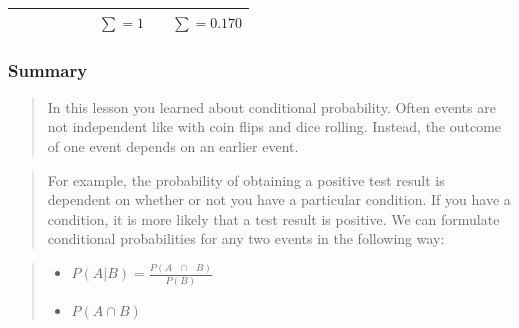\documentclass[]{book}
\providecommand{\tightlist}{%
  \setlength{\itemsep}{0pt}\setlength{\parskip}{0pt}}
\begin{document}
\begin{longtable}[]{@{}ccccccccc@{}}
\begin{minipage}[t]{0.04\columnwidth}\centering\strut
\strut
\end{minipage} & \begin{minipage}[t]{0.04\columnwidth}\centering\strut
\strut
\end{minipage} & \begin{minipage}[t]{0.04\columnwidth}\centering\strut
\strut
\end{minipage} & \begin{minipage}[t]{0.04\columnwidth}\centering\strut
\strut
\end{minipage} & \begin{minipage}[t]{0.04\columnwidth}\centering\strut
\strut
\end{minipage} & \begin{minipage}[t]{0.04\columnwidth}\centering\strut
\strut
\end{minipage} & \begin{minipage}[t]{0.04\columnwidth}\centering\strut
\(\sum = 1\)\strut
\end{minipage} & \begin{minipage}[t]{0.04\columnwidth}\centering\strut
\strut
\end{minipage} & \begin{minipage}[t]{0.04\columnwidth}\centering\strut
\(\sum = 0.170\)\strut
\end{minipage}\tabularnewline
\bottomrule
\end{longtable}

\subsubsection{Summary}\label{summary-2}

\begin{quote}
In this lesson you learned about conditional probability. Often events
are not independent like with coin flips and dice rolling. Instead, the
outcome of one event depends on an earlier event.
\end{quote}

\begin{quote}
For example, the probability of obtaining a positive test result is
dependent on whether or not you have a particular condition. If you have
a condition, it is more likely that a test result is positive. We can
formulate conditional probabilities for any two events in the following
way:
\end{quote}

\begin{quote}
\begin{itemize}
\tightlist
\item
  \(P(A|B) = \frac{P(A\text{ }\cap\text{ }B)}{P(B)}\)
\item
  \(P(A ∩ B)\)
\end{itemize}
\end{quote}
\end{document}
